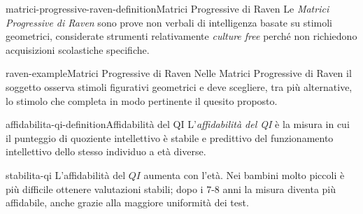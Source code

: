 \documentclass[preview]{standalone}
\begin{document}
\begin{snippetdefinition}{matrici-progressive-raven-definition}{Matrici Progressive di Raven}
    Le \emph{Matrici Progressive di Raven} sono prove non verbali di
    intelligenza basate su stimoli geometrici, considerate strumenti
    relativamente \emph{culture free} perché non richiedono acquisizioni
    scolastiche specifiche.
\end{snippetdefinition}

\begin{snippetexample}{raven-example}{Matrici Progressive di Raven}
    Nelle Matrici Progressive di Raven il soggetto osserva stimoli figurativi
    geometrici e deve scegliere, tra più alternative, lo stimolo che completa in
    modo pertinente il quesito proposto.
\end{snippetexample}


\begin{snippetdefinition}{affidabilita-qi-definition}{Affidabilità del QI}
    L'\emph{affidabilità del QI} è la misura in cui il punteggio di quoziente
    intellettivo è stabile e predittivo del funzionamento intellettivo dello
    stesso individuo a età diverse.
\end{snippetdefinition}

\begin{snippet}{stabilita-qi}
    L'affidabilità del \(QI\) aumenta con l'età. Nei bambini molto piccoli è più
    difficile ottenere valutazioni stabili; dopo i \(7\)-\(8\) anni la misura
    diventa più affidabile, anche grazie alla maggiore uniformità dei test.
\end{snippet}

\end{document}

